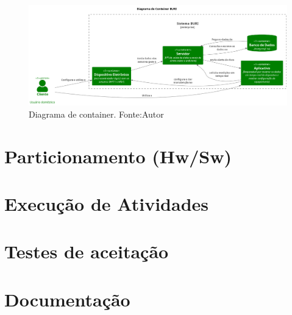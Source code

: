 \begin{figure}[ht]
    \centering
    \includegraphics[width=.94\textwidth]{img/conteiner-diagram.png}
    \caption{Diagrama de container. Fonte:Autor}\label{figConteinerDiagram}
\end{figure}



\section{Particionamento (Hw/Sw)}\label{fase3}

\section{Execução de Atividades}\label{fase4}

\section{Testes de aceitação}\label{fase5}

\section{Documentação}\label{fase6}